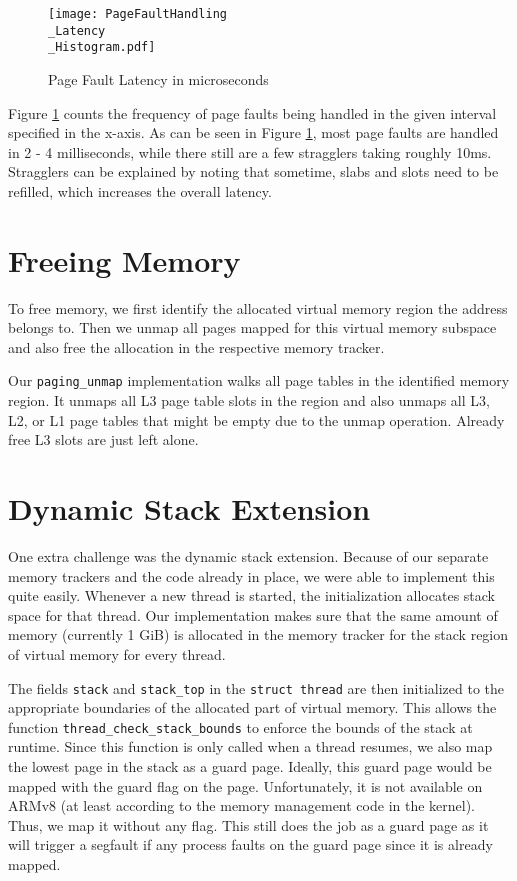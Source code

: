 \begin{figure}
    \centering
    \texttt{[image: PageFaultHandling\\\_Latency\\\_Histogram.pdf]}
    \caption{Page Fault Latency in microseconds}
    \label{fig:pfaults}
\end{figure}
Figure \ref{fig:pfaults} counts the frequency of page faults being handled in the given interval specified in the x-axis.
As can be seen in Figure \ref{fig:pfaults}, most page faults are handled in 2 - 4 milliseconds, while there
still are a few stragglers taking roughly 10ms. Stragglers can be explained by noting that sometime, 
slabs and slots need to be refilled, which increases the overall latency.

\section{Freeing Memory}
To free memory, we first identify the allocated virtual memory region the address belongs to.
Then we unmap all pages mapped for this virtual memory subspace and also free the allocation in the
respective memory tracker.

Our \texttt{paging_unmap} implementation walks all page tables in the identified memory region.
It unmaps all L3 page table slots in the region and also unmaps all L3, L2, or L1 page tables that might
be empty due to the unmap operation. Already free L3 slots are just left alone.

\section{Dynamic Stack Extension}
One extra challenge was the dynamic stack extension. Because of our separate memory trackers and the
code already in place, we were able to implement this quite easily. Whenever a new thread is started,
the initialization allocates stack space for that thread. Our implementation makes sure that the same
amount of memory (currently 1 GiB) is
allocated in the memory tracker for the stack region of virtual memory for every thread.

The fields \texttt{stack} and \texttt{stack_top} in the \texttt{struct thread} 
are then initialized to the appropriate boundaries of the allocated part of virtual memory. This allows
the function \texttt{thread_check_stack_bounds} to enforce the bounds of the stack at runtime.
Since this function is only called when a thread resumes, we also map the lowest page in the stack as
a guard page. Ideally, this guard page would be mapped with the guard flag on the page. Unfortunately,
it is not available on ARMv8 (at least according to the memory management code in the kernel). Thus,
we map it without any flag. This still does the job as a guard page as it will trigger a segfault if
any process faults on the guard page since it is already mapped.

